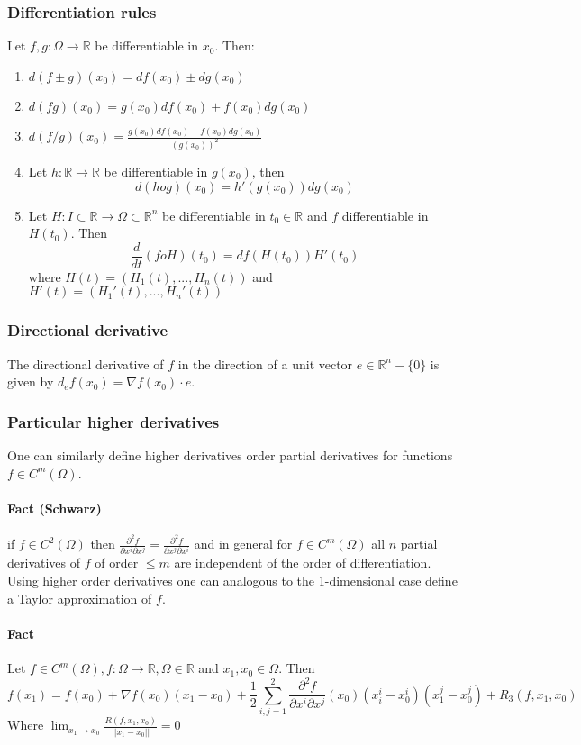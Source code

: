 \documentclass[11pt,a4paper]{book}
\begin{document}
\subsubsection{Differentiation rules}
Let $f,g:\Omega \rightarrow \mathbb{R}$ be differentiable in $x_0$. Then:
\begin{enumerate}
\item $d(f\pm g)(x_0)=df(x_0)\pm dg(x_0)$
\item $d(fg)(x_0)=g(x_0)df(x_0)+f(x_0)dg(x_0)$
\item $d(f/g)(x_0)=\frac{g(x_0)df(x_0)-f(x_0)dg(x_0)}{(g(x_0))^2}$
\item Let $h:\mathbb{R} \rightarrow \mathbb{R}$ be differentiable in $g(x_0)$, then
$$d(h o g)(x_0)=h'(g(x_0))dg(x_0)$$
\item Let $H:I\subset \mathbb{R} \rightarrow \Omega \subset \mathbb{R}^n$ be differentiable in $t_0 \in \mathbb{R}$ and $f$ differentiable in $H(t_0)$. Then 
$$\frac{d}{dt} (f o H)(t_0)=df(H(t_0))H'(t_0)$$ where $H(t)=(H_1(t),...,H_n(t))$ and $H'(t)=(H_1'(t), ..., H_n'(t))$
\end{enumerate}

\subsubsection{Directional derivative}
The directional derivative of $f$ in the direction of a unit vector $e \in \mathbb{R}^n-\{0\}$ is given by 
$d_ef(x_0)=\nabla f(x_0) \cdot e$. 

\subsubsection{Particular higher derivatives}
One can similarly define higher derivatives order partial derivatives for functions $f \in C^m(\Omega)$.
\paragraph*{Fact (Schwarz)} if $f \in C^2(\Omega)$ then $\frac{\partial^2 f}{\partial x^i \partial x^j}=\frac{\partial^2 f}{\partial x^j \partial x^i}$
and in general for $f \in C^m(\Omega)$ all $n$  partial derivatives of $f$ of order $\leq m$ are independent of the order of differentiation.
Using higher order derivatives one can analogous to the 1-dimensional case define a Taylor approximation of $f$.

\paragraph*{Fact} Let $f \in C^m(\Omega), f:\Omega \rightarrow \mathbb{R}, \Omega \in \mathbb{R}$ and $x_1,x_0 \in \Omega$. Then 
$$f(x_1)=f(x_0)+\nabla f(x_0)(x_1-x_0)+\frac{1}{2}\sum_{i,j=1}^2 \frac{\partial^2 f}{\partial x^i \partial x^j}(x_0)(x_i^i-x_0^i)(x_1^j-x_0^j) + R_3(f,x_1,x_0)$$ 
Where $\lim_{x_1 \rightarrow x_0} \frac{R(f,x_1,x_0)}{||x_1-x_0||}=0$
\end{document}
